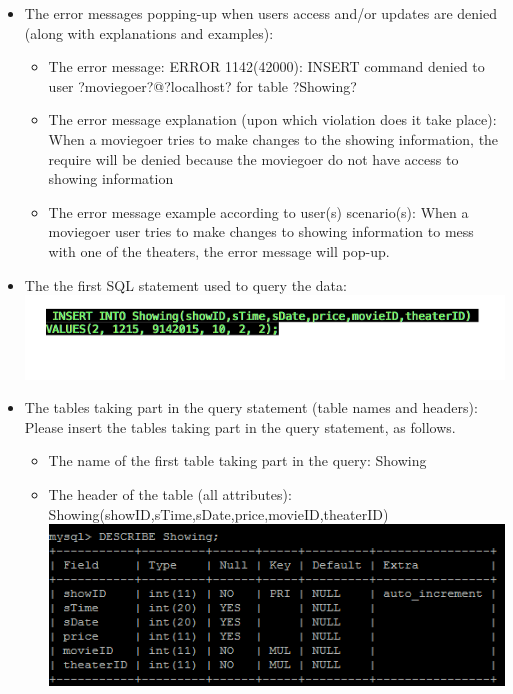 {\begin{itemize}
\begin{itemize}
	  \item{The attributes of the table taking part in the query: }
	  showID,sTime,sDate,price,movieID,theaterID
	 \end{itemize}
\item{}
	The error messages popping-up when users access and/or updates are denied (along with explanations and examples):
	\begin{itemize} 
	\item{The error message: }
	 ERROR 1142(42000): INSERT command denied to user ?moviegoer?@?localhost? for table ?Showing?
	\item{The error message explanation (upon which violation does it take place): }
	When a moviegoer tries to make changes to the showing information, the require will be denied because the moviegoer do not have access to showing information
	\item{The error message example according to user(s) scenario(s): }
	When a moviegoer user tries to make changes to showing information to mess with one of the theaters, the error message will pop-up.
	 \end{itemize}
\item{The the first SQL statement used to query the data: }
	\includegraphics[scale=0.3]{IC.png}
\item{The tables taking part in the query statement (table names and headers): }
	Please insert the tables taking part in the query statement, as follows.
	 \begin{itemize} 
	 \item{The name of the first table taking part in the query: }
	Showing
	\item{The header of the table  (all attributes): }
	Showing(showID,sTime,sDate,price,movieID,theaterID)
	\includegraphics[scale=0.3]{m.png}

\end{itemize}
\end{itemize}}
